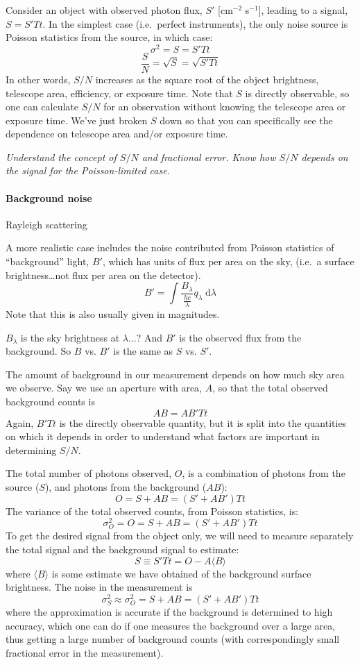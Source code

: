 \documentclass[12pt]{article}
\newcommand{\mynotes}[1]{\textcolor{myBlue}{#1}}
\newcommand{\test}[1]{%
    \begin{center}
        {\parbox{0.9\textwidth}{\textit{\small#1}}}
    \end{center}}
\begin{document}
Consider an object with observed photon flux, $S'$
[cm$^{-2}$ s$^{-1}$], leading to a signal, $S = S'Tt$.
In the simplest case (i.e.\ perfect instruments), the only noise source is
Poisson statistics from the source, in which case:
\[
    \sigma^{2} = S = S'Tt
    \]
\[
    \frac{S}{N} = \sqrt{S} = \sqrt{S'Tt}
    \]
In other words, $S/N$ increases as the square root of the object brightness,
telescope area, efficiency, or exposure time. Note that $S$ is directly
observable, so one can calculate $S/N$ for an observation without knowing the
telescope area or exposure time. We've just broken $S$ down so that you can
specifically see the dependence on telescope area and/or exposure time.

\test{Understand the concept of $S/N$ and fractional error. Know how $S/N$
depends on the signal for the Poisson-limited case.}

\paragraph{Background noise}
\mynotes{Rayleigh scattering}

A more realistic case includes the noise contributed from Poisson statistics of
``background'' light, $B'$, which has units of flux per area on the sky, (i.e.\
a surface brightness\ldots not flux per area on the detector).
\[
    B' = \int{ \frac{B_{\lambda}}{\frac{hc}{\lambda}}
    q_{\lambda} \;\mathrm{d}\lambda }
    \]
Note that this is also usually given in magnitudes.

\mynotes{$B_{\lambda}$ is the sky brightness at $\lambda
\ldots$? And $B'$ is the observed flux from the background.
So $B$ vs. $B'$ is the same as $S$ vs. $S'$.}

The amount of background in our measurement depends on how much sky area we
observe. Say we use an aperture with area, $A$, so that the total observed
background counts is
\[
    AB = AB'Tt
    \]
Again, $B'Tt$ is the directly observable quantity, but it is split into the
quantities on which it depends in order to understand what factors are
important in determining $S/N$.

The total number of photons observed, $O$, is a combination of
photons from the source ($S$), and photons from the background ($AB$):
\[
    O = S + AB = (S' + AB')Tt
    \]
The variance of the total observed counts, from Poisson statistics, is:
\[
    \sigma^{2}_{O} = O =  S + AB = (S' + AB')Tt
    \]
To get the desired signal from the object only, we will need to measure
separately the total signal and the background signal to estimate:
\[
    S \equiv S'Tt = O - A \langle B \rangle
    \]
where $ \langle B \rangle $ is some estimate we have obtained of the background
surface brightness. The noise in the measurement is
\[
    \sigma^{2}_{S} \approx \sigma^{2}_{O} = S + AB = (S' + AB')Tt
    \]
where the approximation is accurate if the background is determined to high
accuracy, which one can do if one measures the background over a large area,
thus getting a large number of background counts (with correspondingly small
fractional error in the measurement).
\end{document}
